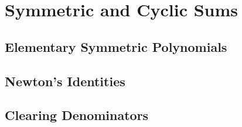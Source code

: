 \documentclass[../../main.tex]{subfiles}
\begin{document}
\section{Symmetric and Cyclic Sums}

\subsection{Elementary Symmetric Polynomials}

\subsection{Newton's Identities}

\subsection{Clearing Denominators}
\end{document}
